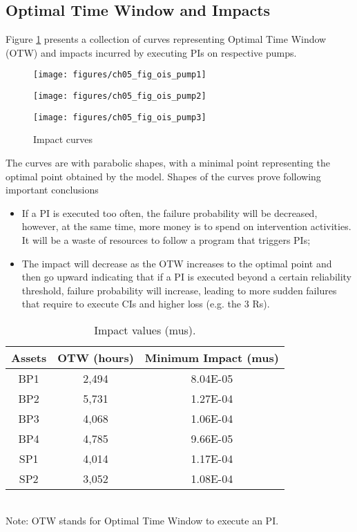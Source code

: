 \subsection{Optimal Time Window and Impacts}
Figure \ref{ch05_fig_ois} presents a collection of curves representing Optimal Time Window (OTW) and impacts incurred by executing PIs on respective pumps.
\begin{figure}[!htb]
	\begin{minipage}[b]{0.5\linewidth}
		\centering
		\texttt{[image: figures/ch05\_fig\_ois\_pump1]}
		\caption*{a - BP\#1}
	\end{minipage}
	\hspace{0.05cm}
	\begin{minipage}[b]{0.5\linewidth}
		\centering
		\texttt{[image: figures/ch05\_fig\_ois\_pump2]}
		\caption*{b - BP\#2}
	\end{minipage}
	\hspace{0.05cm}
\begin{minipage}[b]{0.5\linewidth}
	\centering
	\texttt{[image: figures/ch05\_fig\_ois\_pump3]}
	\caption*{c - BP\#3}
\end{minipage}
\caption{Impact curves}
\label{ch05_fig_ois}
\end{figure}

The curves are with parabolic shapes, with a minimal point representing the optimal point obtained by the model. Shapes of the curves prove following important conclusions

\begin{itemize}
\item If a PI is executed too often, the failure probability will be decreased, however, at the same time, more money is to spend on intervention activities. It will be a waste of resources to follow a program that triggers PIs;
\item The impact will decrease as the OTW increases to the optimal point and then go upward indicating that if a PI is executed beyond a certain reliability threshold, failure probability will increase, leading to more sudden failures that require to execute CIs and higher loss (e.g. the 3 Rs).
\end{itemize}


\begin{table}[h]
	\caption{Impact values (mus).}
	\label{ch05_tbl_impactvalue02}
	{\footnotesize
\begin{tabular}{c|c|c}
	\hline
	Assets & OTW (hours) & Minimum Impact (mus) \\ 
	\hline
	BP1 & 2,494 & 8.04E-05 \\ 
	BP2 & 5,731 & 1.27E-04 \\ 
	BP3 & 4,068 & 1.06E-04 \\ 
	BP4 & 4,785 & 9.66E-05 \\ 
	SP1 & 4,014 & 1.17E-04 \\ 
	SP2 & 3,052 & 1.08E-04 \\ 
	\hline
\end{tabular}\\
		Note: OTW stands for Optimal Time Window to execute an PI.
	}
\end{table}

